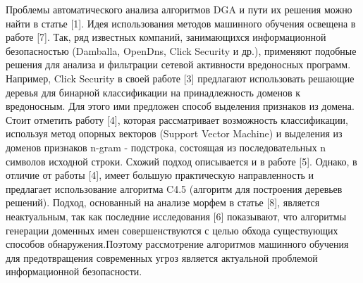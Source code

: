 Проблемы автоматического анализа алгоритмов DGA и пути их решения можно найти в статье [1]. Идея использования методов машинного обучения освещена в работе [7]. Так, ряд известных компаний, занимающихся информационной безопасностью (Damballa, OpenDns, Click Security и др.), применяют подобные решения для анализа и фильтрации сетевой активности вредоносных программ. Например, Click Security в своей работе [3] предлагают использовать решающие деревья для бинарной классификации на принадлежность доменов к вредоносным. Для этого ими предложен способ выделения признаков из домена. Стоит отметить работу [4], которая рассматривает возможность классификации, используя метод опорных векторов (Support Vector Machine) и выделения из доменов признаков n-gram - подстрока, состоящая из последовательных n символов исходной строки. Схожий подход описывается и в работе [5]. Однако, в отличие от работы [4], имеет большую практическую направленность и предлагает использование алгоритма C4.5 (алгоритм для построения деревьев решений). Подход, основанный на анализе морфем в статье [8], является неактуальным, так как последние исследования [6] показывают, что алгоритмы генерации доменных имен совершенствуются с целью обхода существующих способов обнаружения.Поэтому рассмотрение алгоритмов машинного обучения для предотвращения современных угроз является актуальной проблемой информационной безопасности.

\clearpage